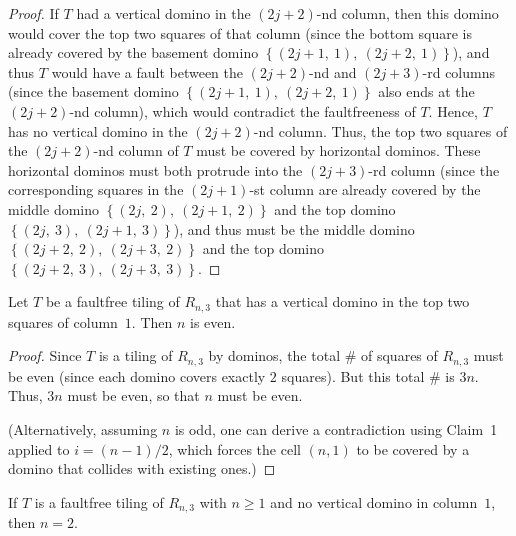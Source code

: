 \begin{proof}
If $T$ had a vertical domino in the $\left(  2j+2\right)  $-nd column, then
this domino would cover the top two squares of that column (since the bottom
square is already covered by the basement domino $\left\{  \left(
2j+1,\ 1\right)  ,\ \left(  2j+2,\ 1\right)  \right\}  $), and thus $T$ would
have a fault between the $\left(  2j+2\right)  $-nd and $\left(  2j+3\right)
$-rd columns (since the basement domino $\left\{  \left(  2j+1,\ 1\right)
,\ \left(  2j+2,\ 1\right)  \right\}  $ also ends at the $\left(  2j+2\right)
$-nd column), which would contradict the faultfreeness of $T$. Hence, $T$ has
no vertical domino in the $\left(  2j+2\right)  $-nd column. Thus, the top two
squares of the $\left(  2j+2\right)  $-nd column of $T$ must be covered by
horizontal dominos. These horizontal dominos must both protrude into the
$\left(  2j+3\right)  $-rd column (since the corresponding squares in the
$\left(  2j+1\right)  $-st column are already covered by the middle domino
$\left\{  \left(  2j,\ 2\right)  ,\ \left(  2j+1,\ 2\right)  \right\}  $ and
the top domino $\left\{  \left(  2j,\ 3\right)  ,\ \left(  2j+1,\ 3\right)
\right\}  $), and thus must be the middle domino $\left\{  \left(
2j+2,\ 2\right)  ,\ \left(  2j+3,\ 2\right)  \right\}  $ and the top domino
$\left\{  \left(  2j+2,\ 3\right)  ,\ \left(  2j+3,\ 3\right)  \right\}  $.
\end{proof}

\begin{lemma}[Claim 2]
\label{lem.details.domino.claim2}
\leanhelper
\leanok
Let $T$ be a faultfree tiling of $R_{n,3}$ that has a vertical domino in the
top two squares of column~$1$. Then $n$ is even.
\end{lemma}

\begin{proof}
\leanok
Since $T$ is a
tiling of $R_{n,3}$ by dominos, the total \# of squares of $R_{n,3}$ must be
even (since each domino covers exactly $2$ squares). But this total \# is
$3n$. Thus, $3n$ must be even, so that $n$ must be even.

(Alternatively, assuming $n$ is odd, one can derive a contradiction
using Claim~1 applied to $i = (n-1)/2$, which forces the cell $(n,1)$
to be covered by a domino that collides with existing ones.)
\end{proof}

\begin{lemma}
\label{lem.details.domino.no-vertical-implies-n-eq-2}
\leanhelper
\leanok
If $T$ is a faultfree tiling of $R_{n,3}$ with $n \ge 1$ and no vertical
domino in column~$1$, then $n = 2$.
\end{lemma}

